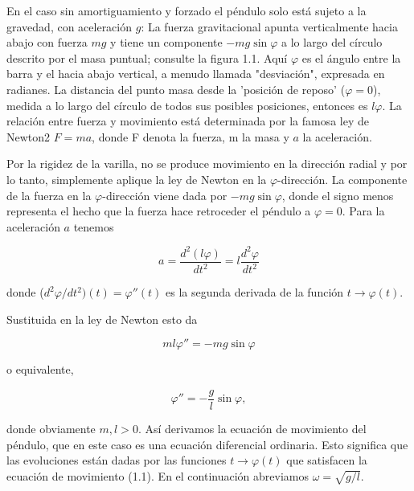 \documentclass{beamer}
\begin{document}
\begin{frame}

En el caso sin amortiguamiento y forzado el péndulo solo está sujeto a la gravedad,
con aceleración $g$: La fuerza gravitacional apunta verticalmente hacia abajo con
fuerza $mg$ y tiene un componente $-mg \sin \varphi$ a lo largo del círculo descrito por el
masa puntual; consulte la figura 1.1. Aquí $\varphi$ es el ángulo entre la barra y el hacia abajo
vertical, a menudo llamada "desviación", expresada en radianes. La distancia del punto
masa desde la 'posición de reposo' ($\varphi = 0$), medida a lo largo del círculo de todos sus posibles
posiciones, entonces es $l \varphi$. La relación entre fuerza y movimiento está determinada por
la famosa ley de Newton2 $F=ma$,  donde F denota la fuerza, m la masa y $a$ la
aceleración.



\end{frame}


\begin{frame}

Por la rigidez de la varilla, no se produce movimiento en la dirección radial y
por lo tanto, simplemente aplique la ley de Newton en la $\varphi$-dirección. La componente de la fuerza en
la $\varphi$-dirección viene dada por $-mg \sin \varphi$, donde el signo menos representa el hecho
que la fuerza hace retroceder el péndulo a $\varphi = 0$. Para la aceleración $a$ tenemos

\[
a = \frac{d^2 (l \varphi)}{d t^2} = l \frac{d^2 \varphi}{dt^2}
\]


donde ($d^2 \varphi / dt^2)(t) = \varphi''(t)$ es la segunda derivada de la función $ t \to \varphi(t)$.

\end{frame}


\begin{frame}

Sustituida en la ley de Newton esto da

\[
ml \varphi'' = -mg \sin \varphi
\]

o equivalente,

\[
\varphi'' = - \frac{g}{l} \sin \varphi,
\]

donde obviamente $m, l >0$. Así derivamos la ecuación de movimiento del péndulo,
que en este caso es una ecuación diferencial ordinaria. Esto significa que las evoluciones
están dadas por las funciones $t \to \varphi(t)$ que satisfacen la ecuación de movimiento (1.1). En el
continuación abreviamos $\omega = \sqrt{g/l}$.

\end{frame}


\begin{frame}


\end{frame}


\begin{frame}


\end{frame}


\begin{frame}


\end{frame}


\begin{frame}


\end{frame}


\begin{frame}


\end{frame}
\end{document}
